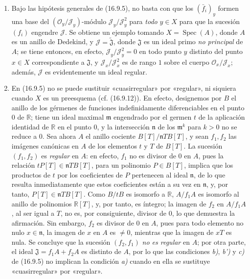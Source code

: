 \begin{remarks}[16.9.6]
\label{IV.16.9.6}
\begin{enumerate}
  \item[(i)] Bajo las hipótesis generales de (16.9.5), no basta con que los $(\bar f_i)_y$ formen
  una base del $(\mathcal{O}_y/\mathscr{J}_y)$-módulo
  $\mathscr{J}_y/\mathscr{J}_y^2$ para \emph{todo} $y\in X$ para que la sucesión
  $(f_i)$ engendre $\mathscr{J}$. Se obtiene un ejemplo
  tomando
  $X=\operatorname{Spec}(A)$, donde $A$ es un anillo de Dedekind, y
  $\mathscr{J}=\widetilde{\mathfrak{J}}$, donde $\mathfrak{J}$ es un ideal
  primo \emph{no principal} de $A$; se tiene entonces, en efecto,
  $\mathscr{J}_y/\mathscr{J}_y^2=0$ en todo punto $y$ distinto del punto
  $x\in X$ correspondiente a $\mathfrak{J}$, y
  $\mathscr{J}_x/\mathscr{J}_x^2$ es de rango $1$ sobre el cuerpo
  $\mathcal{O}_x/\mathscr{J}_x$; además, $\mathscr{J}$ es evidentemente un
  ideal regular.
  \item[(ii)] En (16.9.5) no se puede sustituir «cuasirregular» por
  «regular», ni siquiera cuando $X$ es un preesquema (cf. (16.9.12)). En
  efecto, designemos por $B$ el anillo de los gérmenes de funciones
  indefinidamente diferenciables en el punto $0$ de $\mathbb{R}$; tiene un
  ideal maximal $\mathfrak{m}$ engendrado por el germen $t$ de la aplicación
  identidad de $\mathbb{R}$ en el punto $0$, y la intersección $\mathfrak{n}$
  de los $\mathfrak{m}^k$ para $k>0$ no se reduce a $0$. Sea ahora $A$ el
  anillo cociente $B[T]/\mathfrak{n}TB[T]$, y sean $f_1,f_2$ las imágenes
  canónicas en $A$ de los elementos $t$ y $T$ de $B[T]$. La sucesión
  $(f_1,f_2)$ es \emph{regular} en $A$: en efecto, $f_1$ no es divisor de $0$ en
  $A$, pues la relación $tP[T]\in\mathfrak{n}TB[T]$, para un polinomio
  $P\in B[T]$, implica que los productos de $t$ por los coeficientes de $P$
  pertenecen al ideal $\mathfrak{n}$, de lo que resulta inmediatamente que
  estos coeficientes están a su vez en $\mathfrak{n}$, y, por tanto,
  $P[T]\in\mathfrak{n}TB[T]$. Como $B/tB$ es isomorfo a $\mathbb{R}$,
  $A/f_1A$ es isomorfo al anillo de polinomios $\mathbb{R}[T]$, y, por tanto,
  es íntegro; la imagen de $f_2$ en $A/f_1A$, al ser igual a $T$, no es, por
  consiguiente, divisor de $0$, lo que demuestra la afirmación. Sin embargo,
  $f_2$ es divisor de $0$ en $A$, pues para todo elemento no nulo
  $x\in\mathfrak{n}$, la imagen de $x$ en $A$ es $\ne0$, mientras que la
  imagen de $xT$ es nula. Se concluye que la sucesión $(f_2,f_1)$ \emph{no es
  regular} en $A$; por otra parte, el ideal $\mathfrak{J}=f_1A+f_2A$ es
  distinto de $A$, por lo que las condiciones \emph{b)}, \emph{b')} y \emph{c)} de (16.9.5) no
  implican la condición \emph{a)} cuando en ella se sustituye «cuasirregular» por
  «regular».
\end{enumerate}
\end{remarks}

